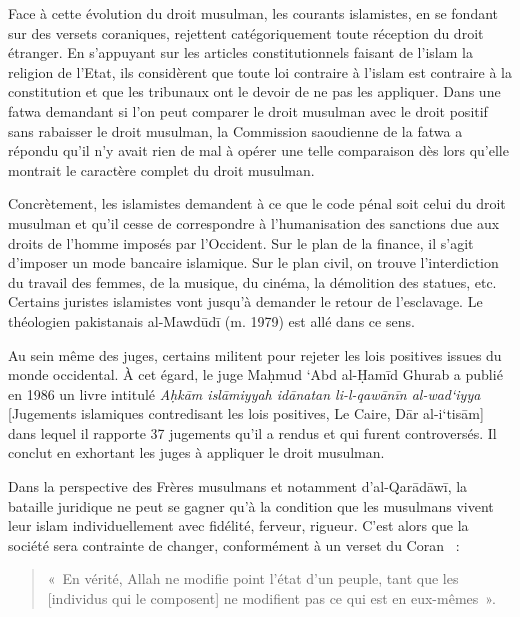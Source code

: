 Face à cette évolution du droit musulman, les courants islamistes, en se
fondant sur des versets coraniques, rejettent catégoriquement toute
réception du droit étranger. En s'appuyant sur les articles
constitutionnels faisant de l'islam la religion de l'Etat, ils
considèrent que toute loi contraire à l'islam est contraire à la
constitution et que les tribunaux ont le devoir de ne pas les appliquer.
Dans une fatwa demandant si l'on peut comparer le droit musulman avec le
droit positif sans rabaisser le droit musulman, la Commission saoudienne
de la fatwa a répondu qu'il n'y avait rien de mal à opérer une telle
comparaison dès lors qu'elle montrait le caractère complet du droit
musulman.

Concrètement, les islamistes demandent à ce que le code pénal soit celui
du droit musulman et qu'il cesse de correspondre à l'humanisation des
sanctions due aux droits de l'homme imposés par l'Occident. Sur le plan
de la finance, il s'agit d'imposer un mode bancaire islamique. Sur le
plan civil, on trouve l'interdiction du travail des femmes, de la
musique, du cinéma, la démolition des statues, etc. Certains juristes
islamistes vont jusqu'à demander le retour de l'esclavage. Le théologien
pakistanais al-Mawdūdī (m. 1979) est allé dans ce sens.

Au sein même des juges, certains militent pour rejeter les lois
positives issues du monde occidental. À cet égard, le juge Maḥmud `Abd
al-Ḥamīd Ghurab a publié en 1986 un livre intitulé \emph{Aḥkām
islāmiyyah idānatan li-l-qawānīn al-wad`iyya} {[}Jugements islamiques
contredisant les lois positives, Le Caire, Dār al-i`tisām{]} dans lequel
il rapporte 37 jugements qu'il a rendus et qui furent controversés. Il
conclut en exhortant les juges à appliquer le droit musulman.

Dans la perspective des Frères musulmans et notamment d'al-Qarādāwī, la
bataille juridique ne peut se gagner qu'à la condition que les musulmans
vivent leur islam individuellement avec fidélité, ferveur, rigueur.
C'est alors que la société sera contrainte de changer, conformément à un
verset du Coran~  :


\begin{quote}
    

«~En vérité, Allah ne modifie point l'état d'un peuple, tant que les
{[}individus qui le composent{]} ne modifient pas ce qui est en
eux-mêmes~».
\end{quote}

